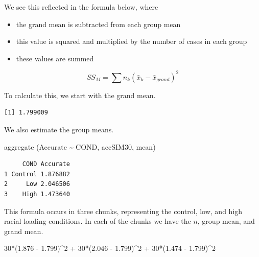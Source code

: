 \documentclass[
  english,
]{book}
\newenvironment{Shaded}{\begin{snugshade}}{\end{snugshade}}
\newcommand{\DecValTok}[1]{\textcolor[rgb]{0.00,0.00,0.81}{#1}}
\newcommand{\FloatTok}[1]{\textcolor[rgb]{0.00,0.00,0.81}{#1}}
\newcommand{\FunctionTok}[1]{\textcolor[rgb]{0.00,0.00,0.00}{#1}}
\newcommand{\NormalTok}[1]{#1}
\newcommand{\SpecialCharTok}[1]{\textcolor[rgb]{0.00,0.00,0.00}{#1}}
\providecommand{\tightlist}{%
  \setlength{\itemsep}{0pt}\setlength{\parskip}{0pt}}
\begin{document}
We see this reflected in the formula below, where

\begin{itemize}
\tightlist
\item
  the grand mean is subtracted from each group mean
\item
  this value is squared and multiplied by the number of cases in each group
\item
  these values are summed
\end{itemize}

\[SS_{M}= \sum n_{k}(\bar{x}_{k}-\bar{x}_{grand})^{2}\]

To calculate this, we start with the grand mean.

\begin{Shaded}
\end{Shaded}

\begin{verbatim}
[1] 1.799009
\end{verbatim}

We also estimate the group means.

\begin{Shaded}
\begin{Highlighting}[]
\FunctionTok{aggregate}\NormalTok{ (Accurate }\SpecialCharTok{\textasciitilde{}}\NormalTok{ COND, accSIM30, mean)}
\end{Highlighting}
\end{Shaded}

\begin{verbatim}
     COND Accurate
1 Control 1.876882
2     Low 2.046506
3    High 1.473640
\end{verbatim}

This formula occurs in three chunks, representing the control, low, and high racial loading conditions. In each of the chunks we have the \(n\), group mean, and grand mean.

\begin{Shaded}
\begin{Highlighting}[]
\DecValTok{30}\SpecialCharTok{*}\NormalTok{(}\FloatTok{1.876} \SpecialCharTok{{-}} \FloatTok{1.799}\NormalTok{)}\SpecialCharTok{\^{}}\DecValTok{2} \SpecialCharTok{+} \DecValTok{30}\SpecialCharTok{*}\NormalTok{(}\FloatTok{2.046} \SpecialCharTok{{-}} \FloatTok{1.799}\NormalTok{)}\SpecialCharTok{\^{}}\DecValTok{2} \SpecialCharTok{+} \DecValTok{30}\SpecialCharTok{*}\NormalTok{(}\FloatTok{1.474} \SpecialCharTok{{-}} \FloatTok{1.799}\NormalTok{)}\SpecialCharTok{\^{}}\DecValTok{2}
\end{Highlighting}
\end{Shaded}
\end{document}
